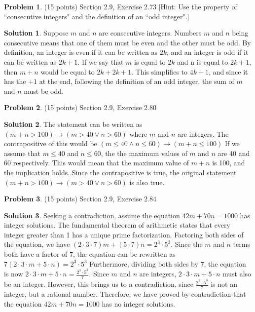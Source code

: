 \documentclass{article}
\theoremstyle{definition}
\newtheorem{problem}{Problem}
\newtheorem*{solution}{Solution}
\begin{document}
\newpage
\begin{problem} (15 points) Section 2.9, Exercise 2.73
[Hint: Use the property of ``consecutive integers" and the definition of an ``odd integer".]
\end{problem}
\begin{solution} 
Suppose $m$ and $n$ are consecutive integers. Numbers $m$ and $n$ being consecutive means that one of them must be even and the other must be odd.
By definition, an integer is even if it can be written as $2k$, and an integer is odd if it can be written as $2k + 1$.
If we say that $m$ is equal to $2k$ and n is equal to $2k + 1$, then $m + n$ would be equal to $2k + 2k + 1$.
This simplifies to $4k + 1$, and since it has the $+1$ at the end, following the definition of an odd integer, the sum of $m$ and $n$ must be odd.
\end{solution}

\newpage
\begin{problem} (15 points) Section 2.9, Exercise 2.80 
\end{problem}
\begin{solution}
The statement can be written as $(m + n > 100) \rightarrow (m > 40 \lor n > 60)$ where $m$ and $n$ are integers.
The contrapositive of this would be $(m \leq 40 \land n \leq 60) \rightarrow (m + n \leq 100)$
If we assume that $m \leq 40$ and $n \leq 60$, the the maximum values of $m$ and $n$ are 40 and 60 respectively. 
This would mean that the maximum value of $m + n$ is 100, and the implication holds.
Since the contrapositive is true, the original statement $(m + n > 100) \rightarrow (m > 40 \lor n > 60)$ is also true.
\end{solution}

\newpage
\begin{problem} (15 points) Section 2.9, Exercise 2.84 
\end{problem}
\begin{solution} 
Seeking a contradiction, assume the equation $42m + 70n = 1000$ has integer solutions.
The fundamental theorem of arithmetic states that every integer greater than 1 has a unique prime factorization.
Factoring both sides of the equation, we have $(2 \cdot 3 \cdot 7)m + (5 \cdot 7)n = 2^{3} \cdot 5^{3}$.
Since the $m$ and $n$ terms both have a factor of 7, the equation can be rewritten as $7(2 \cdot 3 \cdot m + 5 \cdot n) = 2^{3} \cdot 5^{3}$
Furthermore, dividing both sides by 7, the equation is now $2 \cdot 3 \cdot m + 5 \cdot n = \frac{2^{3} \cdot 5^{3}}{7}$.
Since $m$ and $n$ are integers, $2 \cdot 3 \cdot m + 5 \cdot n$ must also be an integer.
However, this brings us to a contradiction, since $\frac{2^{3} \cdot 5^{3}}{7}$ is not an integer, but a rational number.
Therefore, we have proved by contradiction that the equation $42m + 70n = 1000$ has no integer solutions.
\end{solution}
\end{document}
